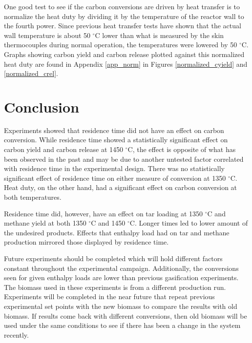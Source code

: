 \documentclass[11pt,twocolumn]{article}
\begin{document}
One good test to see if the carbon conversions are driven by heat transfer is to normalize the heat duty by dividing it by the temperature of the reactor wall to the fourth power.  Since previous heat transfer tests have shown that the actual wall temperature is about 50 $^\circ$C lower than what is measured by the skin thermocouples during normal operation, the temperatures were lowered by 50 $^\circ$C.  Graphs showing carbon yield and carbon release plotted against this normalized heat duty are found in Appendix \ref{app_norm} in Figures \ref{normalized_cyield} and \ref{normalized_crel}.


\balance
\section*{Conclusion}

Experiments showed that residence time did not have an effect on carbon conversion.  While residence time showed a statistically significant effect on carbon yield and carbon release at 1450 $^\circ$C, the effect is opposite of what has been observed in the past and may be due to another untested factor correlated with residence time in the experimental design.  There was no statistically significant effect of residence time on either measure of conversion at 1350 $^\circ$C.  Heat duty, on the other hand, had a significant effect on carbon conversion at both temperatures.

Residence time did, however, have an effect on tar loading at 1350 $^\circ$C and methane yield at both 1350 $^\circ$C and 1450 $^\circ$C.  Longer times led to lower amount of the undesired products.  Effects that enthalpy load had on tar and methane production mirrored those displayed by residence time.

Future experiments should be completed which will hold different factors constant throughout the experimental campaign.  Additionally, the conversions seen for given enthalpy loads are lower than previous gasification experiments.  The biomass used in these experiments is from a different production run.  Experiments will be completed in the near future that repeat previous experimental set points with the new biomass to compare the results with old biomass.  If results come back with different conversions, then old biomass will be used under the same conditions to see if there has been a change in the system recently.

\onecolumn
\newpage
\appendix
\end{document}
